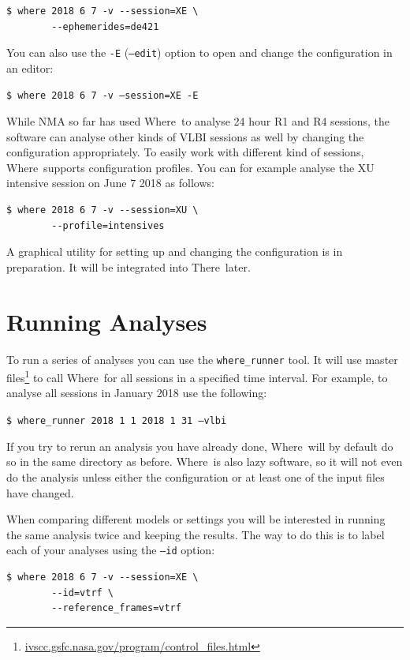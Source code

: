 \documentclass[twocolumn,twoside]{svmultivs_gm} %
\newcommand{\code}[1]{{\footnotesize\texttt{#1}}}
\newcommand{\where}{\textsf{Where}}
\newcommand{\there}{\textsf{There}}
\begin{document}
{\footnotesize\begin{verbatim}
$ where 2018 6 7 -v --session=XE \
        --ephemerides=de421
\end{verbatim}}

You can also use the \code{-E} (\code{--edit}) option to open and change the configuration in an editor:

\code{\$ where 2018 6 7 -v --session=XE -E}

While NMA so far has used \where\ to analyse 24 hour R1 and R4 sessions, the software can analyse other kinds of VLBI sessions as well by changing the configuration appropriately. To easily work with different kind of sessions, \where\ supports configuration profiles. You can for example analyse the XU intensive session on June 7 2018 as follows:

{\footnotesize\begin{verbatim}
$ where 2018 6 7 -v --session=XU \
        --profile=intensives
\end{verbatim}}

A graphical utility for setting up and changing the configuration is in preparation. It will be integrated into \there\ later.
%
\section{Running Analyses}
\label{sec:analysing_results}
%
To run a series of analyses you can use the \code{where\_runner} tool. It will use master files\footnote{\url{ivscc.gsfc.nasa.gov/program/control\_files.html}} to call \where\ for all sessions in a specified time interval. For example, to analyse all sessions in January 2018 use the following:

\code{\$ where\_runner 2018 1 1 2018 1 31 --vlbi}

If you try to rerun an analysis you have already done, \where\ will by default do so in the same directory as before. \where\ is also lazy software, so it will not even do the analysis unless either the configuration or at least one of the input files have changed.

When comparing different models or settings you will be interested in running the same analysis twice and keeping the results. The way to do this is to label each of your analyses using the \code{--id} option:

{\footnotesize\begin{verbatim}
$ where 2018 6 7 -v --session=XE \
        --id=vtrf \
        --reference_frames=vtrf
\end{verbatim}}
\end{document}
